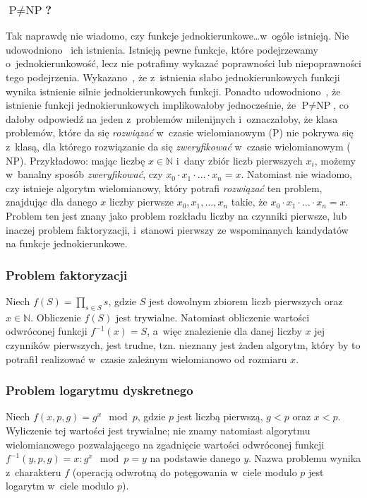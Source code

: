 \subsubsection{$\textrm{P} \neq \textrm{NP}$?}
Tak naprawdę nie wiadomo, czy funkcje jednokierunkowe\ldots w~ogóle istnieją.
Nie udowodniono~\cite{one_way_functions_existence} ich istnienia. Istnieją
pewne funkcje, które podejrzewamy o~jednokierunkowość, lecz nie potrafimy
wykazać poprawności lub niepoprawności tego podejrzenia.
Wykazano~\cite{one_way_functions}, że z~istnienia słabo jednokierunkowych
funkcji wynika istnienie silnie jednokierunkowych funkcji. Ponadto
udowodniono~\cite{one_way_functions}, że istnienie funkcji jednokierunkowych
implikowałoby jednocześnie, że $\textrm{P} \neq \textrm{NP}$, co dałoby
odpowiedź na jeden z~problemów milenijnych i~oznaczałoby, że klasa problemów,
które da się \emph{rozwiązać} w~czasie wielomianowym ($\textrm{P}$) nie pokrywa
się z~klasą, dla którego rozwiązanie da się \emph{zweryfikować} w~czasie
wielomianowym ($\textrm{NP}$). Przykładowo: mając liczbę $x \in \mathbb{N}$
i~dany zbiór liczb pierwszych $x_i$, możemy w~banalny sposób
\emph{zweryfikować}, czy $x_0 \cdot x_1 \cdot \ldots \cdot x_n = x$. Natomiast
nie wiadomo, czy istnieje algorytm wielomianowy, który potrafi \emph{rozwiązać}
ten problem, znajdując dla danego $x$ liczby pierwsze $x_0, x_1, \ldots, x_n$
takie, że $x_0 \cdot x_1 \cdot \ldots \cdot x_n = x$. Problem ten jest znany
jako problem rozkładu liczby na czynniki pierwsze, lub inaczej problem
faktoryzacji, i~stanowi pierwszy ze wspominanych kandydatów na funkcje
jednokierunkowe.



\subsubsection{Problem faktoryzacji}
Niech $f(S) = \prod_{s \in S} s$, gdzie $S$ jest dowolnym zbiorem liczb
pierwszych oraz $x \in \mathbb{N}$. Obliczenie $f(S)$ jest trywialne. Natomiast
obliczenie wartości odwróconej funkcji $f^{-1}(x)=S$, a~więc znalezienie dla
danej liczby $x$ jej czynników pierwszych, jest trudne, tzn. nieznany jest
żaden algorytm, który by to potrafił realizować w~czasie zależnym wielomianowo
od rozmiaru $x$.



\subsubsection{Problem logarytmu dyskretnego}
Niech $f(x, p, g) = g^x \mod p$, gdzie $p$ jest liczbą pierwszą, $g < p$ oraz
$x < p$. Wyliczenie tej wartości jest trywialne; nie znamy natomiast algorytmu
wielomianowego pozwalającego na zgadnięcie wartości odwróconej funkcji
\mbox{$f^{-1}(y, p, g) = x : g^x \mod p = y$} na podstawie danego $y$. Nazwa
problemu wynika z~charakteru $f$ (operacją odwrotną do potęgowania w~ciele
modulo $p$ jest logarytm w~ciele modulo $p$).




